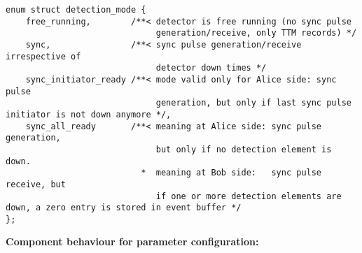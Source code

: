 \begin{lstlisting}[caption={Definition of the \texttt{detection\_mode} enumeration type}, captionpos=b, label={lst:detection_mode}]
enum struct detection_mode {
    free_running,        /**< detector is free running (no sync pulse
                              generation/receive, only TTM records) */
    sync,                /**< sync pulse generation/receive irrespective of
                              detector down times */
    sync_initiator_ready /**< mode valid only for Alice side: sync pulse
                              generation, but only if last sync pulse initiator is not down anymore */,
    sync_all_ready       /**< meaning at Alice side: sync pulse generation,
                              but only if no detection element is down.
                           *  meaning at Bob side:   sync pulse receive, but
                              if one or more detection elements are down, a zero entry is stored in event buffer */
};
\end{lstlisting}
\noindent
\textbf{Component behaviour for parameter configuration:}
